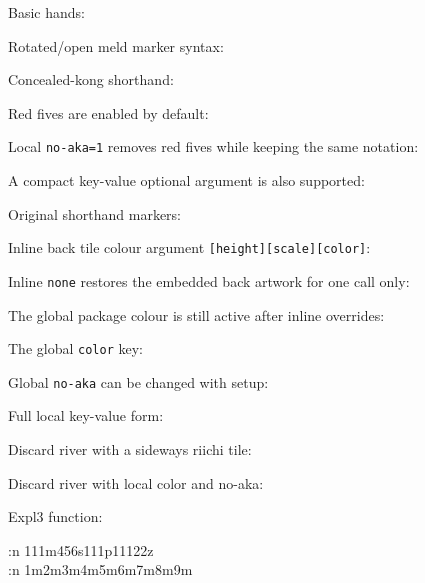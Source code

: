 \documentclass{article}
\begin{document}
Basic hands:




Rotated/open meld marker syntax:


Concealed-kong shorthand:


Red fives are enabled by default:


Local \texttt{no-aka=1} removes red fives while keeping the same notation:


A compact key-value optional argument is also supported:


Original shorthand markers:


Inline back tile colour argument \texttt{[height][scale][color]}:



Inline \texttt{none} restores the embedded back artwork for one call only:


The global package colour is still active after inline overrides:


The global \texttt{color} key:



Global \texttt{no-aka} can be changed with setup:



Full local key-value form:



Discard river with a sideways riichi tile:


Discard river with local color and no-aka:


Expl3 function:

\ExplSyntaxOn
\pongtex:n {111m456s111p11122z}
\\
\pongtexriver:n {1m2m3m4m5m6m7m8m9m}
\ExplSyntaxOff
\end{document}
